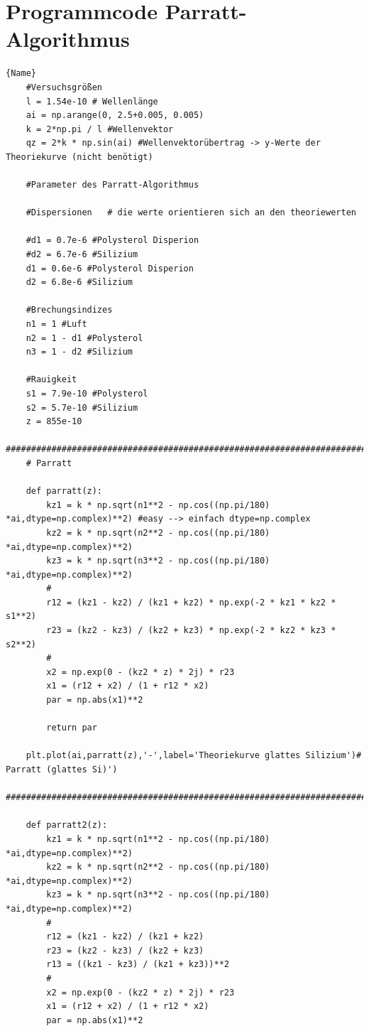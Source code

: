 \section{Programmcode Parratt-Algorithmus}
\begin{lstlisting}{Name}
    #Versuchsgrößen
    l = 1.54e-10 # Wellenlänge
    ai = np.arange(0, 2.5+0.005, 0.005)
    k = 2*np.pi / l #Wellenvektor
    qz = 2*k * np.sin(ai) #Wellenvektorübertrag -> y-Werte der Theoriekurve (nicht benötigt)
    
    #Parameter des Parratt-Algorithmus
    
    #Dispersionen   # die werte orientieren sich an den theoriewerten
                    
    #d1 = 0.7e-6 #Polysterol Disperion
    #d2 = 6.7e-6 #Silizium 
    d1 = 0.6e-6 #Polysterol Disperion
    d2 = 6.8e-6 #Silizium 
    
    #Brechungsindizes
    n1 = 1 #Luft
    n2 = 1 - d1 #Polysterol
    n3 = 1 - d2 #Silizium
    
    #Rauigkeit
    s1 = 7.9e-10 #Polysterol 
    s2 = 5.7e-10 #Silizium 
    z = 855e-10 
    ########################################################################################################
    # Parratt
    
    def parratt(z):
        kz1 = k * np.sqrt(n1**2 - np.cos((np.pi/180) *ai,dtype=np.complex)**2) #easy --> einfach dtype=np.complex
        kz2 = k * np.sqrt(n2**2 - np.cos((np.pi/180) *ai,dtype=np.complex)**2)
        kz3 = k * np.sqrt(n3**2 - np.cos((np.pi/180) *ai,dtype=np.complex)**2)
        #
        r12 = (kz1 - kz2) / (kz1 + kz2) * np.exp(-2 * kz1 * kz2 * s1**2)
        r23 = (kz2 - kz3) / (kz2 + kz3) * np.exp(-2 * kz2 * kz3 * s2**2)
        #
        x2 = np.exp(0 - (kz2 * z) * 2j) * r23
        x1 = (r12 + x2) / (1 + r12 * x2)
        par = np.abs(x1)**2
    
        return par
    
    plt.plot(ai,parratt(z),'-',label='Theoriekurve glattes Silizium')# Parratt (glattes Si)')
    ########################################################################################################
    
    def parratt2(z):
        kz1 = k * np.sqrt(n1**2 - np.cos((np.pi/180) *ai,dtype=np.complex)**2)
        kz2 = k * np.sqrt(n2**2 - np.cos((np.pi/180) *ai,dtype=np.complex)**2)
        kz3 = k * np.sqrt(n3**2 - np.cos((np.pi/180) *ai,dtype=np.complex)**2)
        #
        r12 = (kz1 - kz2) / (kz1 + kz2)
        r23 = (kz2 - kz3) / (kz2 + kz3)
        r13 = ((kz1 - kz3) / (kz1 + kz3))**2
        #
        x2 = np.exp(0 - (kz2 * z) * 2j) * r23
        x1 = (r12 + x2) / (1 + r12 * x2)
        par = np.abs(x1)**2
        

\end{lstlisting}
